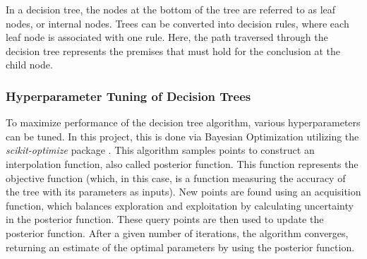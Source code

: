 In a decision tree, the nodes at the bottom of the tree are referred to as leaf nodes, or internal nodes. Trees can be converted into decision rules, where each leaf node is associated with one rule. Here, the path traversed through the decision tree represents the premises that must hold for the conclusion at the child node.

\subsubsection*{Hyperparameter Tuning of Decision Trees}\label{Section_Bayesian_Optimization}

To maximize performance of the decision tree algorithm, various hyperparameters can be tuned. In this project, this is done via Bayesian Optimization \citep{BayesOptPaper} utilizing the \textit{scikit-optimize} package \citep{skopt}. This algorithm samples points to construct an interpolation function, also called posterior function. This function represents the objective function (which, in this case, is a function measuring the accuracy of the tree with its parameters as inputs). New points are found using an acquisition function, which balances exploration and exploitation by calculating uncertainty in the posterior function. These query points are then used to update the posterior function. After a given number of iterations, the algorithm converges, returning an estimate of the optimal parameters by using the posterior function.